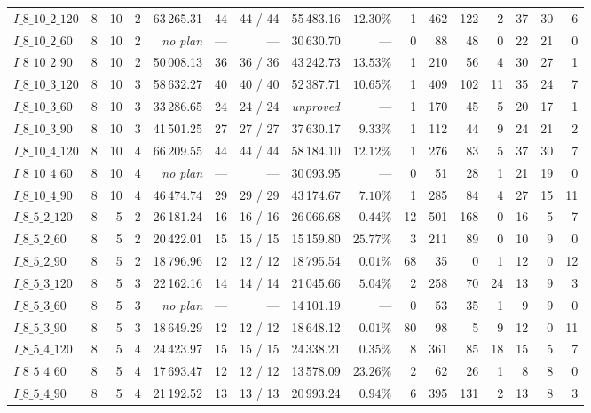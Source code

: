 \begin{table}[!htbp]
{\begin{tabular}{lrrrrrrlrrrrrrrr}
$I\_8\_10\_2\_120$ & 8 & 10 & 2 & 63\,265.31 & 44 & 44 / 44 & 55\,483.16 & $12.30\%$ & 1 & 462 & 122 & 2 & 37 & 30 & 6 \\
$I\_8\_10\_2\_60$ & 8 & 10 & 2 & \emph{no plan} & --- & --- & 30\,630.70 & --- & 0 & 88 & 48 & 0 & 22 & 21 & 0 \\
$I\_8\_10\_2\_90$ & 8 & 10 & 2 & 50\,008.13 & 36 & 36 / 36 & 43\,242.73 & $13.53\%$ & 1 & 210 & 56 & 4 & 30 & 27 & 1 \\
$I\_8\_10\_3\_120$ & 8 & 10 & 3 & 58\,632.27 & 40 & 40 / 40 & 52\,387.71 & $10.65\%$ & 1 & 409 & 102 & 11 & 35 & 24 & 7 \\
$I\_8\_10\_3\_60$ & 8 & 10 & 3 & 33\,286.65 & 24 & 24 / 24 & \emph{unproved} & --- & 1 & 170 & 45 & 5 & 20 & 17 & 1 \\
$I\_8\_10\_3\_90$ & 8 & 10 & 3 & 41\,501.25 & 27 & 27 / 27 & 37\,630.17 & $9.33\%$ & 1 & 112 & 44 & 9 & 24 & 21 & 2 \\
$I\_8\_10\_4\_120$ & 8 & 10 & 4 & 66\,209.55 & 44 & 44 / 44 & 58\,184.10 & $12.12\%$ & 1 & 276 & 83 & 5 & 37 & 30 & 7 \\
$I\_8\_10\_4\_60$ & 8 & 10 & 4 & \emph{no plan} & --- & --- & 30\,093.95 & --- & 0 & 51 & 28 & 1 & 21 & 19 & 0 \\
$I\_8\_10\_4\_90$ & 8 & 10 & 4 & 46\,474.74 & 29 & 29 / 29 & 43\,174.67 & $7.10\%$ & 1 & 285 & 84 & 4 & 27 & 15 & 11 \\
$I\_8\_5\_2\_120$ & 8 & 5 & 2 & 26\,181.24 & 16 & 16 / 16 & 26\,066.68 & $0.44\%$ & 12 & 501 & 168 & 0 & 16 & 5 & 7 \\
$I\_8\_5\_2\_60$ & 8 & 5 & 2 & 20\,422.01 & 15 & 15 / 15 & 15\,159.80 & $25.77\%$ & 3 & 211 & 89 & 0 & 10 & 9 & 0 \\
$I\_8\_5\_2\_90$ & 8 & 5 & 2 & 18\,796.96 & 12 & 12 / 12 & 18\,795.54 & $0.01\%$ & 68 & 35 & 0 & 1 & 12 & 0 & 12 \\
$I\_8\_5\_3\_120$ & 8 & 5 & 3 & 22\,162.16 & 14 & 14 / 14 & 21\,045.66 & $5.04\%$ & 2 & 258 & 70 & 24 & 13 & 9 & 3 \\
$I\_8\_5\_3\_60$ & 8 & 5 & 3 & \emph{no plan} & --- & --- & 14\,101.19 & --- & 0 & 53 & 35 & 1 & 9 & 9 & 0 \\
$I\_8\_5\_3\_90$ & 8 & 5 & 3 & 18\,649.29 & 12 & 12 / 12 & 18\,648.12 & $0.01\%$ & 80 & 98 & 5 & 9 & 12 & 0 & 11 \\
$I\_8\_5\_4\_120$ & 8 & 5 & 4 & 24\,423.97 & 15 & 15 / 15 & 24\,338.21 & $0.35\%$ & 8 & 361 & 85 & 18 & 15 & 5 & 7 \\
$I\_8\_5\_4\_60$ & 8 & 5 & 4 & 17\,693.47 & 12 & 12 / 12 & 13\,578.09 & $23.26\%$ & 2 & 62 & 26 & 1 & 8 & 8 & 0 \\
$I\_8\_5\_4\_90$ & 8 & 5 & 4 & 21\,192.52 & 13 & 13 / 13 & 20\,993.24 & $0.94\%$ & 6 & 395 & 131 & 2 & 13 & 8 & 3 \\
\bottomrule
\end{tabular}}
\end{table}

